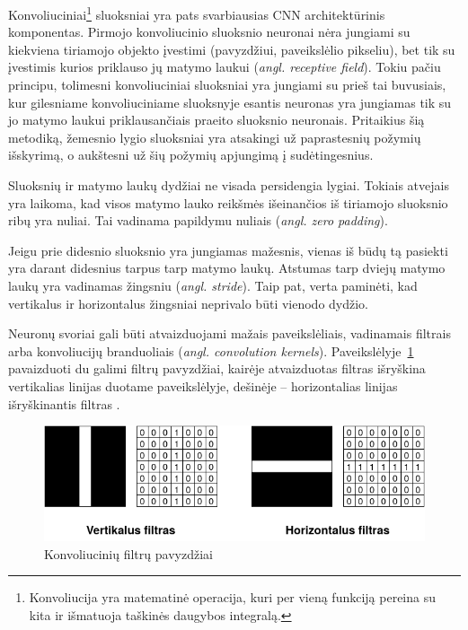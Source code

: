 \documentclass{VUMIFPSbakalaurinis}
\begin{document}
{
	Konvoliuciniai\footnote{Konvoliucija yra matematinė operacija, kuri per vieną funkciją pereina su kita ir išmatuoja taškinės daugybos integralą.} sluoksniai yra pats svarbiausias CNN architektūrinis komponentas. Pirmojo konvoliucinio sluoksnio neuronai nėra jungiami su kiekviena tiriamojo objekto įvestimi (pavyzdžiui, paveikslėlio pikseliu), bet tik su įvestimis kurios priklauso jų matymo laukui (\textit{angl. receptive field}). Tokiu pačiu principu, tolimesni konvoliuciniai sluoksniai yra jungiami su prieš tai buvusiais, kur gilesniame konvoliuciniame sluoksnyje esantis neuronas yra jungiamas tik su jo matymo laukui priklausančiais praeito sluoksnio neuronais. Pritaikius šią metodiką, žemesnio lygio sluoksniai yra atsakingi už paprastesnių požymių išskyrimą, o aukštesni už šių požymių apjungimą į sudėtingesnius.\par
	
	Sluoksnių ir matymo laukų dydžiai ne visada persidengia lygiai. Tokiais atvejais yra laikoma, kad visos matymo lauko reikšmės išeinančios iš tiriamojo sluoksnio ribų yra nuliai. Tai vadinama papildymu nuliais (\textit{angl. zero padding}).\par
	
	Jeigu prie didesnio sluoksnio yra jungiamas mažesnis, vienas iš būdų tą pasiekti yra darant didesnius tarpus tarp matymo laukų. Atstumas tarp dviejų matymo laukų yra vadinamas žingsniu (\textit{angl. stride}). Taip pat, verta paminėti, kad vertikalus ir horizontalus žingsniai neprivalo būti vienodo dydžio. \par
	
	Neuronų svoriai gali būti atvaizduojami mažais paveikslėliais, vadinamais filtrais arba konvoliucijų branduoliais (\textit{angl. convolution kernels}). Paveikslėlyje~\ref{img:cnn_filters} pavaizduoti du galimi filtrų pavyzdžiai, kairėje atvaizduotas filtras išryškina vertikalias linijas duotame paveikslėlyje, dešinėje -- horizontalias linijas išryškinantis filtras \cite{cnn_filters, handson}.
	\begin{figure}[H]
		\centering
		\includegraphics[scale=0.5]{img/cnn_filters}
		\caption{Konvoliucinių filtrų pavyzdžiai}
		\label{img:cnn_filters}
	\end{figure} 
	
}
\end{document}
